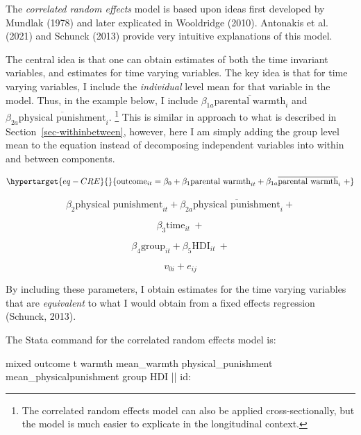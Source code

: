 \documentclass[
  letterpaper,
  DIV=11,
  numbers=noendperiod]{scrreprt}
\newenvironment{Shaded}{\begin{snugshade}}{\end{snugshade}}
\newcommand{\FunctionTok}[1]{\textcolor[rgb]{0.28,0.35,0.67}{#1}}
\newcommand{\NormalTok}[1]{\textcolor[rgb]{0.00,0.23,0.31}{#1}}
\begin{document}
The \emph{correlated random effects} model is based upon ideas first
developed by Mundlak (1978) and later explicated in Wooldridge (2010).
Antonakis et al. (2021) and Schunck (2013) provide very intuitive
explanations of this model.

The central idea is that one can obtain estimates of both the time
invariant variables, and estimates for time varying variables. The key
idea is that for time varying variables, I include the \emph{individual}
level mean for that variable in the model. Thus, in the example below, I
include \(\beta_{1a}\overline{\text{parental warmth}}_{i}\) and
\(\beta_{2a}\overline{\text{physical punishment}}_{i}\). \footnote{The
  correlated random effects model can also be applied cross-sectionally,
  but the model is much easier to explicate in the longitudinal context.}
This is similar in approach to what is described in
Section~\ref{sec-withinbetween}, however, here I am simply adding the
group level mean to the equation instead of decomposing independent
variables into within and between components.

\begin{equation}\protect\hypertarget{eq-CRE}{}{\text{outcome}_{it} = \beta_0 + \beta_1 \text{parental warmth}_{it} + \beta_{1a}\overline{\text{parental warmth}}_{i} \ + }\label{eq-CRE}\end{equation}

\[\beta_2 \text{physical punishment}_{it} + \beta_{2a}\overline{\text{physical punishment}}_{i} + \]

\[\beta_3 \text{time}_{it} \ + \]

\[\beta_4 \text{group}_{it} + \beta_5 \text{HDI}_{it} \ +\]

\[v_{0i} + e_{ij}\]

By including these parameters, I obtain estimates for the time varying
variables that are \emph{equivalent} to what I would obtain from a fixed
effects regression (Schunck, 2013).

The Stata command for the correlated random effects model is:

\begin{Shaded}
\begin{Highlighting}[]

\NormalTok{mixed outcome t warmth mean\_warmth physical\_punishment mean\_physicalpunishment }\FunctionTok{group}\NormalTok{ HDI || id:}
  
\end{Highlighting}
\end{Shaded}
\end{document}
